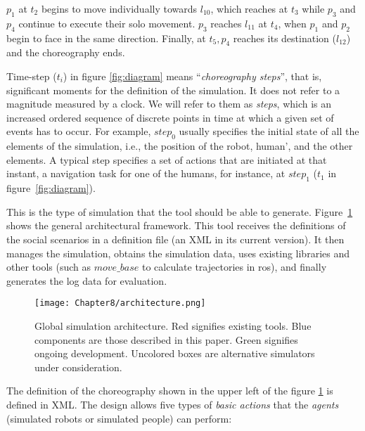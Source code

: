 $p_1$ at $t_2$ begins to move individually towards $l_{10}$, which reaches at $t_3$ while $p_3$ and $p_4$ continue to execute their solo movement. $p_3$ reaches $l_{11}$ at $t_4$, when $p_1$ and $p_2$ begin to face in the same direction. Finally, at $t_5, p_4$ reaches its destination ($l_{12}$) and the choreography ends.

Time-step ($t_i$) in figure \ref{fig:diagram} means ``\emph{choreography steps}'', that is, significant moments for the definition of the simulation. It does not refer to a magnitude measured by a clock. We will refer to them as \emph{steps}, which is an increased ordered sequence of discrete points in time at which a given set of events has to occur. For example, $step_0$ usually specifies the initial state of all the elements of the simulation, i.e., the position of the robot, human', and the other elements. A typical step specifies a set of actions that are initiated at that instant, a navigation task for one of the humans, for instance, at $step_1$ ($t_1$ in figure~\ref{fig:diagram}).


This is the type of simulation that the tool should be able to generate. Figure~\ref{fig:imhus_architecture} shows the general architectural framework. This tool receives the definitions of the social scenarios in a definition file (an XML in its current version). It then manages the simulation, obtains the simulation data, uses existing libraries and other tools (such as $move\_base$ to calculate trajectories in \acrshort{ros}), and finally generates the log data for evaluation.

\begin{figure}
    \centering
    \texttt{[image: Chapter8/architecture.png]}
    \caption{Global simulation architecture. Red signifies existing tools. Blue components are those described in this paper. Green signifies ongoing development. Uncolored boxes are alternative simulators under consideration.}
    \label{fig:imhus_architecture}
\end{figure}

The definition of the choreography shown in the upper left of the figure \ref{fig:imhus_architecture} is defined in XML. The design allows five types of \emph{basic actions} that the \emph{agents} (simulated robots or simulated people) can perform:

